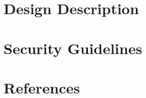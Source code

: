 \documentclass[twoside]{book}
\makeatletter
\newcommand{\+}{\discretionary{\mbox{\scriptsize$\hookleftarrow$}}{}{}}
\renewcommand{\paragraph}{%
  \@startsection{paragraph}{4}{0ex}{-1.0ex}{1.0ex}{%
    \normalfont\normalsize\bfseries\SS@parafont%
  }%
}
\let\oldchapter\chapter
\let\oldsection\section
\let\oldsubsection\subsection
\let\oldsubsubsection\subsubsection
\newcommand\mysection\oldsubsection
\newcommand\mysubsection\oldsubsubsection
\newcommand\mysubsubsection\paragraph
\newcommand\mysectionh\oldchapter
\newcommand\mysubsectionh\oldsection
\newcommand\mysubsubsectionh\oldsubsection
\newcommand\shiftleveldown{%
\makeatletter%
\renewcommand{\section}{\mysection}%
\renewcommand{\subsection}{\mysubsection}%
\renewcommand{\subsubsection}{\mysubsubsection}%
\makeatother%
}
\newcommand\restorelevel{%
\makeatletter%
\renewcommand{\section}{\oldsection}%
\renewcommand{\subsection}{\oldsubsection}%
\renewcommand{\subsubsection}{\oldsubsubsection}%
\makeatother%
}
\newcommand\shiftlevelup{%
\makeatletter%
\renewcommand{\section}{\mysectionh}%
\renewcommand{\subsection}{\mysubsectionh}%
\renewcommand{\subsubsection}{\mysubsubsectionh}%
\makeatother%
}
\makeatother
\begin{document}
\shiftlevelup
\label{index}\hypertarget{index}{}
\restorelevel

\chapter{Design Description}










\shiftleveldown





\restorelevel


\shiftleveldown



\restorelevel




\chapter{Security Guidelines}
\label{_p_c_i_g_u_i_d_a_n_c_e}
\hypertarget{_p_c_i_g_u_i_d_a_n_c_e}{}


\chapter{References}
\label{_r_e_f_e_r_e_n_c_e_s}
\hypertarget{_r_e_f_e_r_e_n_c_e_s}{}



\printindex
\end{document}
